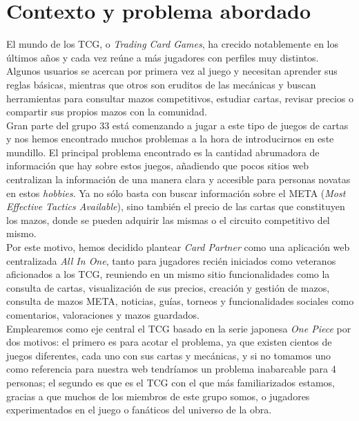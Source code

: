 \documentclass[10pt]{article}
\begin{document}
	\section{Contexto y problema abordado}        
	El mundo de los TCG, o \textit{Trading Card Games}, ha crecido notablemente en los últimos años y cada vez reúne a más jugadores con perfiles muy distintos. Algunos usuarios se acercan por primera vez al juego y necesitan aprender sus reglas básicas, mientras que otros son eruditos de las mecánicas y buscan herramientas para consultar mazos competitivos, estudiar cartas, revisar precios o compartir sus propios mazos con la comunidad.\\
	
	Gran parte del grupo 33 está comenzando a jugar a este tipo de juegos de cartas y nos hemos encontrado muchos problemas a la hora de introducirnos en este mundillo. El principal problema encontrado es la cantidad abrumadora de información que hay sobre estos juegos, añadiendo que pocos sitios web centralizan la información de una manera clara y accesible para personas novatas en estos \textit{hobbies}. Ya no sólo basta con buscar información sobre el META (\textit{Most Effective Tactics Available}), sino también el precio de las cartas que constituyen los mazos, donde se pueden adquirir las mismas o el circuito competitivo del mismo.\\
	
	Por este motivo, hemos decidido plantear \textit{Card Partner} como una aplicación web centralizada \textit{All In One}, tanto para jugadores recién iniciados como veteranos aficionados a los TCG, reuniendo en un mismo sitio funcionalidades como  la consulta de cartas, visualización de sus precios, creación y gestión de mazos, consulta de mazos META, noticias, guías, torneos y funcionalidades sociales como comentarios, valoraciones y mazos guardados.\\
	
	Emplearemos como eje central el TCG basado en la serie japonesa \textit{One Piece} por dos motivos: el primero es para acotar el problema, ya que existen cientos de juegos diferentes, cada uno con sus cartas y mecánicas, y si no tomamos uno como referencia para nuestra web tendríamos un problema inabarcable para 4 personas; el segundo es que es el TCG con el que más familiarizados estamos, gracias a que muchos de los miembros de este grupo somos, o jugadores experimentados en el juego o fanáticos del universo de la obra.
	\newpage
\end{document}
